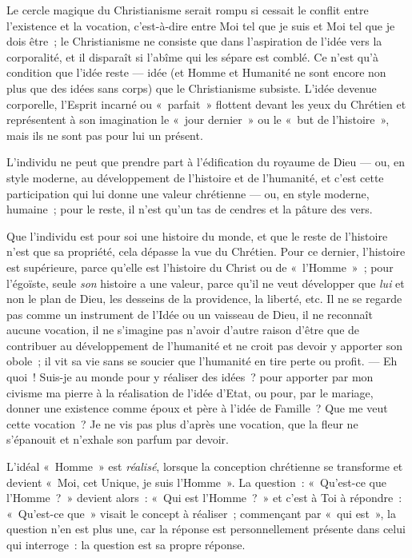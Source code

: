 \documentclass[french,twoside]{book} %
\begin{document}
Le cercle magique du Christianisme serait rompu si cessait le conflit entre l’existence et la vocation, c’est-à-dire entre Moi tel que je suis et Moi tel que je dois être ; le Christianisme ne consiste que dans l’aspiration de l’idée vers la corporalité, et il disparaît si l’abîme qui les sépare est comblé. Ce n’est qu’à condition que l’idée reste — idée (et Homme et Humanité ne sont encore non plus que des idées sans corps) que le Christianisme subsiste. L’idée devenue corporelle, l’Esprit incarné ou « parfait » flottent devant les yeux du Chrétien et représentent à son imagination le « jour dernier » ou le « but de l’histoire », mais ils ne sont pas pour lui un présent.\par
L’individu ne peut que prendre part à l’édification du royaume de Dieu — ou, en style moderne, au développement de l’histoire et de l’humanité, et c’est cette participation qui lui donne une valeur chrétienne — ou, en style moderne, humaine ; pour le reste, il n’est qu’un tas de cendres et la pâture des vers.\par
Que l’individu est pour soi une histoire du monde, et que le reste de l’histoire n’est que sa propriété, cela dépasse la vue du Chrétien. Pour ce dernier, l’histoire est supérieure, parce qu’elle est l’histoire du Christ ou de « l’Homme » ; pour l’égoïste, seule \emph{son }histoire a une valeur, parce qu’il ne veut développer que \emph{lui} et non le plan de Dieu, les desseins de la providence, la liberté, etc. Il ne se regarde pas comme un instrument de l’Idée ou un vaisseau de Dieu, il ne reconnaît aucune vocation, il ne s’imagine pas n’avoir d’autre raison d’être que de contribuer au développement de l’humanité et ne croit pas devoir y apporter son obole ; il vit sa vie sans se soucier que l’humanité en tire perte ou profit. — Eh quoi ! Suis-je au monde pour y réaliser des idées ? pour apporter par mon civisme ma pierre à la réalisation de l’idée  d’Etat, ou pour, par le mariage, donner une existence comme époux et père à l’idée de Famille ? Que me veut cette vocation ? Je ne vis pas plus d’après une vocation, que la fleur ne s’épanouit et n’exhale son parfum par devoir.\par
L’idéal « Homme » est \emph{réalisé}, lorsque la conception chrétienne se transforme et devient « Moi, cet Unique, je suis l’Homme ». La question : « Qu’est-ce que l’Homme ? » devient alors : « Qui est l’Homme ? » et c’est à Toi à répondre : « Qu’est-ce que » visait le concept à réaliser ; commençant par « qui est », la question n’en est plus une, car la réponse est personnellement présente dans celui qui interroge : la question est sa propre réponse.\par
\end{document}
